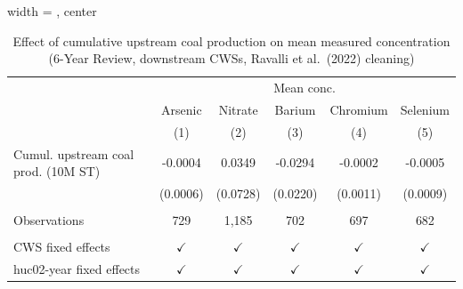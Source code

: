 
\begin{table}[htbp]
   
   \caption{\label{tab:6yr_huc02fe_inorg_val_ravalli} Effect of cumulative upstream coal production on mean measured concentration (6-Year Review, downstream CWSs, Ravalli et al.~(2022) cleaning)}
   \bigskip
   
   \centering
   
   \begin{adjustbox}{width = \textwidth, center}
      
      
      \begin{tabular}{lccccc}
         \toprule
         
          & \multicolumn{5}{c}{Mean conc.}\\
         
                                             & Arsenic       & Nitrate       & Barium        & Chromium      & Selenium \\   
         
                                             & (1)           & (2)           & (3)           & (4)           & (5)\\  
         
         \midrule 
         Cumul. upstream coal prod. (10M ST) & -0.0004       & 0.0349        & -0.0294       & -0.0002       & -0.0005\\   
                                             & (0.0006)      & (0.0728)      & (0.0220)      & (0.0011)      & (0.0009)\\   
         
          \\
         
         Observations                        & 729           & 1,185         & 702           & 697           & 682\\  
         
          \\
         
         CWS fixed effects                   & $\checkmark$  & $\checkmark$  & $\checkmark$  & $\checkmark$  & $\checkmark$\\   
         huc02-year fixed effects            & $\checkmark$  & $\checkmark$  & $\checkmark$  & $\checkmark$  & $\checkmark$\\   
         
         \bottomrule
         
      \end{tabular}
      

\end{adjustbox}
\end{table}

